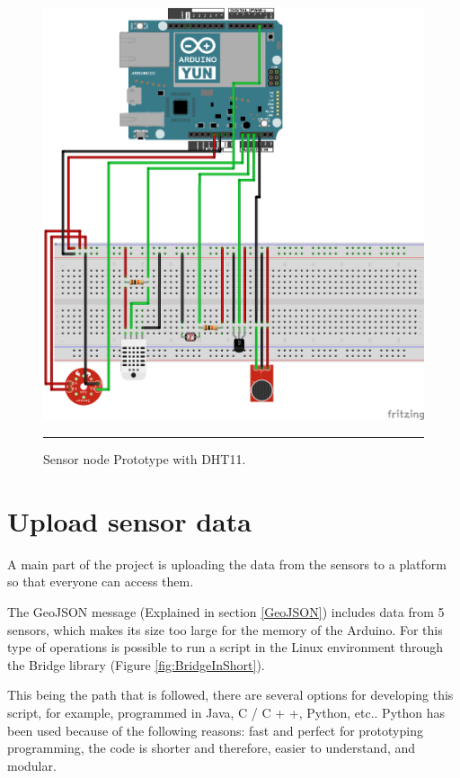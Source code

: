 \documentclass[12pt, a4paper,twoside]{tesi_upf}
\begin{document}
      \begin{figure}[!htbp]
          \centering
              \includegraphics[scale=0.8]{./Figures/Fritzing/AllSensors11_bb.png}
              \rule{25em}{0.5pt}
          \caption[Sensor node Prototype with DHT11]{Sensor node Prototype with DHT11.}
          \label{fig:AllSensors11_bb}
      \end{figure}
    
  \section{Upload sensor data}
  
    A main part of the project is uploading the data from the sensors to a platform so that everyone can access them.
    
    The GeoJSON message (Explained in section \ref{GeoJSON}) includes data from 5 sensors, which makes its size too large for the memory of the Arduino.
    For this type of operations is possible to run a script in the Linux environment through the Bridge library (Figure \ref{fig:BridgeInShort}).
    
    This being the path that is followed, there are several options for developing this script, for example, programmed in Java, C / C + +, Python, etc..
    Python has been used because of the following reasons: fast and perfect for prototyping programming, the code is shorter and therefore, easier to understand, and modular.
    
\end{document}
